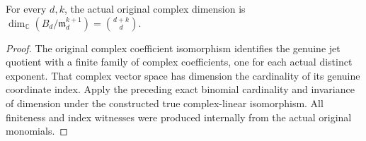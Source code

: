 \begin{theorem}
\label{hir:relative-normal-actual-base-jet-binomial-dimension}
\leanok
For every $d,k$, the actual original complex dimension is
$\dim_{\mathbb C}(B_d/\mathfrak m_d^{k+1})=\binom{d+k}{d}$.
\end{theorem}
\begin{proof}
The original complex coefficient isomorphism identifies the genuine jet
quotient with a finite family of complex coefficients, one for each
actual distinct exponent. That complex vector space has dimension the
cardinality of its genuine coordinate index. Apply the preceding exact
binomial cardinality and invariance of dimension under the constructed
true complex-linear isomorphism. All finiteness and index witnesses were
produced internally from the actual original monomials.
\end{proof}
